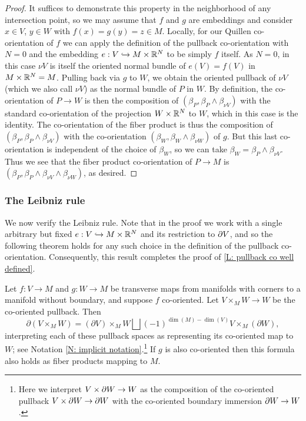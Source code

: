 \begin{proof}
	It suffices to demonstrate this property in the neighborhood of any intersection point, so we may assume that $f$ and $g$ are embeddings and consider $x\in V$, $y\in W$ with $f(x)=g(y)=z\in M$.
	Locally, for our Quillen co-orientation of $f$ we can apply the definition of the pullback co-orientation with $N=0$ and the embedding $e:V\hookrightarrow M\times \mathbb{R}^N$ to be simply $f$ itself.
	As $N=0$, in this case $\nu V$ is itself the oriented normal bundle of $e(V)=f(V)$ in $M\times \mathbb{R}^N=M$.
	Pulling back via $g$ to $W$, we obtain the oriented pullback of $\nu V$ (which we also call $\nu V$) as the normal bundle of $P$ in $W$.
	By definition, the co-orientation of $P\to W$ is then the composition of $(\beta_P,\beta_P\wedge \beta_{\nu V})$ with the standard co-orientation of the projection $W\times \mathbb{R}^N$ to $W$, which in this case is the identity.
	The co-orientation of the fiber product is thus the composition of $(\beta_P,\beta_P\wedge \beta_{\nu V})$ with the co-orientation $(\beta_W,\beta_W\wedge \beta_{\nu W})$ of $g$.
	But this last co-orientation is independent of the choice of $\beta_W$, so we can take $\beta_W=\beta_P\wedge \beta_{\nu V}$.
	Thus we see that the fiber product co-orientation of $P\to M$ is $(\beta_P, \beta_P\wedge \beta_{\nu V}\wedge \beta_{\nu W})$, as desired.
\end{proof}

\subsubsection{The Leibniz rule}

We now verify the Leibniz rule.
Note that in the proof we work with a single arbitrary but fixed $e:V\hookrightarrow M\times \mathbb{R}^N$ and its restriction to $\partial V$, and so the following theorem holds for any such choice in the definition of the pullback co-orientation.
Consequently, this result completes the proof of \cref{L: pullback co well defined}.

\begin{proposition}\label{leibniz}
	Let $f \colon V \to M$ and $g \colon W \to M$ be transverse maps from manifolds with corners to a manifold without boundary, and suppose $f$ co-oriented.
	Let $V \times_M W\to W$ be the co-oriented pullback.
	Then
	$$\partial (V \times_M W) = (\partial V) \times_M W \bigsqcup (-1)^{\dim(M)-\dim(V)} V \times_M (\partial W),$$
	interpreting each of these pullback spaces as representing its co-oriented map to $W$; see Notation \ref{N: implicit notation}.\footnote{Here we interpret $V\times\partial W\to W$ as the composition of the co-oriented pullback $V\times\partial W\to \partial W$ with the co-oriented boundary immersion $\partial W\to W$.} If $g$ is also co-oriented then this formula also holds as fiber products mapping to $M$.
\end{proposition}

